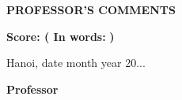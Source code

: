 \thispagestyle{empty}
\begin{center}
	{\textbf{\Large{PROFESSOR'S COMMENTS}}} %
\end{center}

\dotfill \vspace{0.25cm} \par
\dotfill \vspace{0.25cm} \par
\dotfill \vspace{0.25cm} \par
\dotfill \vspace{0.25cm} \par
\dotfill \vspace{0.25cm} \par
\dotfill \vspace{0.25cm} \par
\dotfill \vspace{0.25cm} \par
\dotfill \vspace{0.25cm} \par
\dotfill \vspace{0.25cm} \par
\dotfill \vspace{0.25cm} \par
\dotfill \vspace{0.25cm} \par
\dotfill \vspace{0.25cm} \par
\dotfill \vspace{0.25cm} \par
\dotfill \vspace{0.25cm} \par
\dotfill \vspace{0.25cm} \par
\dotfill \vspace{0.25cm} \par
\dotfill \vspace{0.25cm} \par
\dotfill \vspace{0.25cm} \par
\dotfill
\vspace{1cm}

{\textbf{\large{Score: }}} \hspace{1.0cm}\textbf{( In words:} \hspace{2.5cm}\textbf{)} %

\begin{flushright}
	Hanoi, date \hspace{0.75cm} month \hspace{0.75cm} year 20...\hspace{0.75cm} %

	{\textbf{\large{Professor}}} \hspace{2cm} \textcolor{white}{.} %
\end{flushright}
\clearpage
